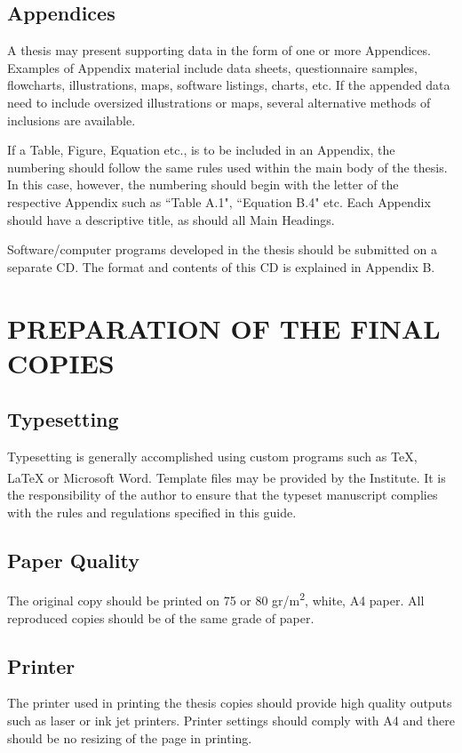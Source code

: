 \documentclass[a4paper,oneside,12pt]{report}
\numberwithin{equation}{chapter}
\begin{document}
\section{Appendices}
A thesis may present supporting data in the form of one or more Appendices. Examples of Appendix material include data sheets, questionnaire samples, flowcharts, illustrations, maps,
software listings, charts, etc. If the appended data need to include
oversized illustrations or maps, several alternative methods of
inclusions are available.

If a Table, Figure, Equation etc., is to be included in an
Appendix, the numbering should follow the same rules used within
the main body of the thesis. In this case, however, the numbering should begin with the letter
of the respective Appendix such as ``Table A.1", ``Equation B.4" etc.
Each Appendix should have a descriptive title, as should all Main Headings.

Software/computer programs developed in the thesis should be submitted on a separate CD. The format and contents of this CD is explained in Appendix B.



\chapter{PREPARATION OF THE FINAL COPIES}


\section{Typesetting}
Typesetting is generally accomplished using custom programs such as \TeX{}, \LaTeX{} or Microsoft Word\textsuperscript{\textregistered}. Template files may be provided by the Institute. It is the responsibility of the author to ensure that the typeset manuscript complies with the rules and regulations specified in this guide.


\section{Paper Quality}
The original copy should be printed on 75 or 80 gr/m\textsuperscript{2}, white, A4 paper. All reproduced copies should be of the same grade of paper.


\section{Printer}
The printer used in printing the thesis copies should provide high quality outputs such as laser or ink jet printers. Printer settings should comply with A4 and there should be no resizing of the page in printing.
\end{document}
